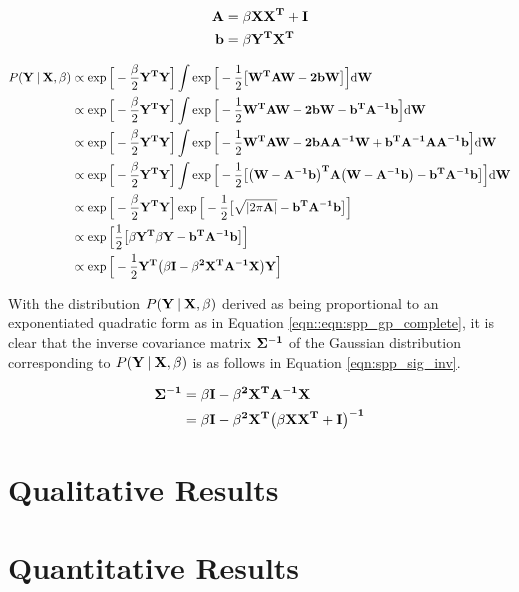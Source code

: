 \begin{align}
  \label{eqn:spp_gp_marginal_change}
  \bf{A} &= \beta \bf{XX}^{T} + \bf{I}\\
  \bf{b} &= \beta \bf{Y}^{T} \bf{X}^{T}
\end{align}

\begin{align}
  \label{eqn:spp_gp_complete}
  P(\bf{Y} \:\vert\: \bf{X}, \beta) &\propto \exp{\Big[ -\frac{\beta}{2}\bf{Y}^{T}\bf{Y} \Big]}
  \int \exp{\Big[ -\frac{1}{2} 
  \big[
    \bf{W}^{T}\bf{AW} - 2\bf{bW}  
  \big]
  \Big]} {\mathrm d{\bf{W}}}\\
  &\propto \exp{\Big[ -\frac{\beta}{2}\bf{Y}^{T}\bf{Y} \Big]}
  \int \exp{\Big[ 
    -\frac{1}{2} \bf{W}^{T}\bf{AW} 
    - 2\bf{bW} 
    - \bf{b}^{T}\bf{A}^{-1}\bf{b}  
  \Big]} {\mathrm d{\bf{W}}}\\
  &\propto \exp{\Big[ -\frac{\beta}{2}\bf{Y}^{T}\bf{Y} \Big]}
  \int \exp{\Big[ 
    -\frac{1}{2} \bf{W}^{T}\bf{AW} 
    - 2\bf{bA}\bf{A}^{-1}\bf{W}
    + \bf{b}^{T}\bf{A}^{-1}\bf{AA}^{-1}\bf{b}  
  \Big]} {\mathrm d{\bf{W}}}\\
  &\propto \exp{\Big[ -\frac{\beta}{2}\bf{Y}^{T}\bf{Y} \Big]}
  \int \exp{\Big[ -\frac{1}{2} \big[ 
      \big( \bf{W} - \bf{A}^{-1}\bf{b} \big)^{T}
      \bf{A}
      \big( \bf{W} - \bf{A}^{-1}\bf{b} \big)
      - \bf{b}^{T}\bf{A}^{-1}\bf{b}
    \big]
  \Big]} {\mathrm d{\bf{W}}}\\
  &\propto \exp{\Big[ -\frac{\beta}{2}\bf{Y}^{T}\bf{Y} \Big]}
  \exp{\Big[ -\frac{1}{2} \big[
      \sqrt{\left| 2 \pi \bf{A} \right|}
      - \bf{b}^{T}\bf{A}^{-1}\bf{b}
    \big]
  \Big]}\\
  &\propto \exp{\Big[ \frac{1}{2} \big[
    \beta \bf{Y}^{T}\beta{Y}
    - \bf{b}^{T}\bf{A}^{-1}\bf{b}
    \big]
  \Big]}\\
  &\propto \exp{\Big[ -\frac{1}{2}
  \bf{Y}^{T} \big(
    \beta \bf{I} - \beta^{2}\bf{X}^{T}\bf{A}^{-1}\bf{X}
    \big)\bf{Y}
  \Big]}
\end{align}

With the distribution $P(\bf{Y} \:\vert\: \bf{X}, \beta)$ derived as being proportional to  
an exponentiated quadratic form as in Equation \ref{eqn::eqn:spp_gp_complete}, it is 
clear that the inverse covariance matrix $\bf{\Sigma}^{-1}$ of the Gaussian distribution 
corresponding to $P(\bf{Y} \:\vert\: \bf{X}, \beta)$ is as follows in Equation 
\ref{eqn:spp_sig_inv}.

\begin{align}
  \label{eqn:spp_sig_inv}
  \bf{\Sigma}^{-1} &= \beta \bf{I} - \beta^{2} \bf{X}^{T} \bf{A}^{-1} \bf{X}\\
  &= \beta \bf{I} - \beta^{2} \bf{X}^{T} \big(\beta \bf{XX}^{T} + \bf{I} \big)^{-1}
\end{align}

\section{Qualitative Results}
\label{sec:spp_qualitative}

\section{Quantitative Results}
\label{sec:spp_quantitative}